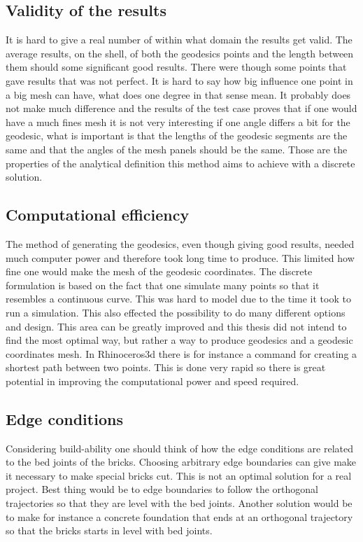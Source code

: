 \subsection{Validity of the results}
It is hard to give a real number of within what domain the results get valid. The average results, on the shell, of both the geodesics points and the length between them should some significant good results. There were though some points that gave results that was not perfect. It is hard to say how big influence one point in a big mesh can have, what does one degree in that sense mean. It probably does not make much difference and the results of the test case proves that if one would have a much fines mesh it is not very interesting if one angle differs a bit for the geodesic, what is important is that the lengths of the geodesic segments are the same and that the angles of the mesh panels should be the same. Those are the properties of the analytical definition this method aims to achieve with a discrete solution.


\subsection{Computational efficiency}
The method of generating the geodesics, even though giving good results, needed much computer power and therefore took long time to produce. This limited how fine one would make the mesh of the geodesic coordinates. The discrete formulation is based on the fact that one simulate many points so that it resembles a continuous curve. This was hard to model due to the time it took to run a simulation. This also effected the possibility to do many different options and design. This area can be greatly improved and this thesis did not intend to find the most optimal way, but rather a way to produce geodesics and a geodesic coordinates mesh. In Rhinoceros3d there is for instance a command for creating a shortest path between two points. This is done very rapid so there is great potential in improving the computational power and speed required.     

\subsection{Edge conditions}

Considering build-ability one should think of how the edge conditions are related to the bed joints of the bricks. Choosing arbitrary edge boundaries can give make it necessary to make special bricks cut. This is not an optimal solution for a real project. Best thing would be to edge boundaries to follow the orthogonal trajectories so that they are level with the bed joints. Another solution would be to make for instance a concrete foundation that ends at an orthogonal trajectory so that the bricks starts in level with bed joints.

